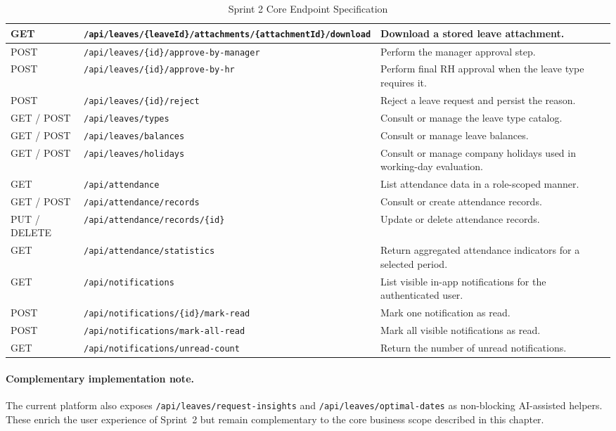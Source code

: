 \begin{table}[H]
\begin{tabular}{|p{}|p{}|p{}|}
GET & \texttt{/api/leaves/\{leaveId\}/attachments/\{attachmentId\}/download} &
Download a stored leave attachment. \\
\hline
POST & \texttt{/api/leaves/\{id\}/approve-by-manager} & Perform the manager approval step. \\
\hline
\rowcolor{tablerowgray}
POST & \texttt{/api/leaves/\{id\}/approve-by-hr} & Perform final RH approval when the leave
type requires it. \\
\hline
POST & \texttt{/api/leaves/\{id\}/reject} & Reject a leave request and persist the reason. \\
\hline
\rowcolor{tablerowgray}
GET / POST & \texttt{/api/leaves/types} & Consult or manage the leave type catalog. \\
\hline
GET / POST & \texttt{/api/leaves/balances} & Consult or manage leave balances. \\
\hline
\rowcolor{tablerowgray}
GET / POST & \texttt{/api/leaves/holidays} & Consult or manage company holidays used in
working-day evaluation. \\
\hline
GET & \texttt{/api/attendance} & List attendance data in a role-scoped manner. \\
\hline
\rowcolor{tablerowgray}
GET / POST & \texttt{/api/attendance/records} & Consult or create attendance records. \\
\hline
PUT / DELETE & \texttt{/api/attendance/records/\{id\}} & Update or delete attendance records. \\
\hline
\rowcolor{tablerowgray}
GET & \texttt{/api/attendance/statistics} & Return aggregated attendance indicators for a
selected period. \\
\hline
GET & \texttt{/api/notifications} & List visible in-app notifications for the authenticated
user. \\
\hline
\rowcolor{tablerowgray}
POST & \texttt{/api/notifications/\{id\}/mark-read} & Mark one notification as read. \\
\hline
POST & \texttt{/api/notifications/mark-all-read} & Mark all visible notifications as read. \\
\hline
\rowcolor{tablerowgray}
GET & \texttt{/api/notifications/unread-count} & Return the number of unread notifications. \\
\hline
\end{tabular}
\caption{Sprint 2 Core Endpoint Specification}
\label{tab:s2_endpoints}
\end{table}

\paragraph{Complementary implementation note.}
The current platform also exposes \texttt{/api/leaves/request-insights} and
\texttt{/api/leaves/optimal-dates} as non-blocking AI-assisted helpers. These enrich the user
experience of Sprint~2 but remain complementary to the core business scope described in this
chapter.

